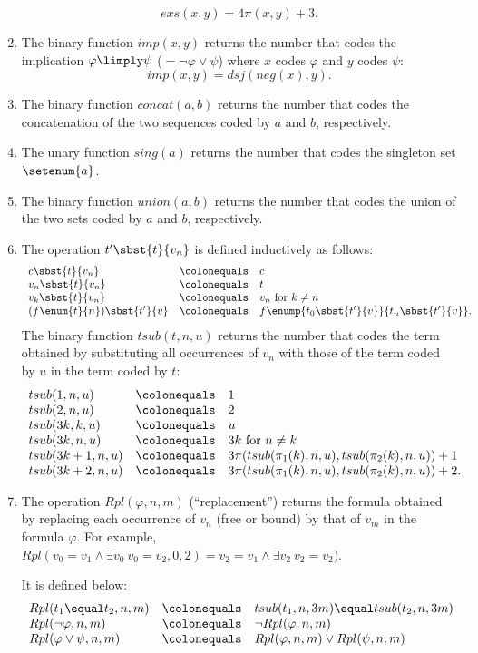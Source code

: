 \begin{enumerate}[1.]
\[
exs(x, y) = 4\pi(x, y) + 3.
\]
%
\item The binary function $imp(x, y)$ returns the number that codes the implication $\varphi \limply \psi$ ($= \neg\varphi \lor \psi$) where $x$ codes $\varphi$ and $y$ codes $\psi$:
\[
imp(x, y) = dsj(neg(x), y).
\]
%
\item The binary function $concat(a, b)$ returns the number that codes the concatenation of the two sequences coded by $a$ and $b$, respectively.
%
\item The unary function $sing(a)$ returns the number that codes the singleton set $\setenum{a}$.
%
\item The binary function $union(a, b)$ returns the number that codes the union of the two sets coded by $a$ and $b$, respectively.
%
\item The operation $t'\sbst{t}{v_n}$ is defined inductively as follows:
\[
\begin{array}{lll}
c\sbst{t}{v_n} & \colonequals & c \cr
v_n\sbst{t}{v_n} & \colonequals & t \cr
v_k\sbst{t}{v_n} & \colonequals & v_n \ \mbox{for \(k \neq n\)} \cr
(f\enum{t}{n})\sbst{t'}{v} & \colonequals & f\enump{t_0\sbst{t'}{v}}{t_n\sbst{t'}{v}}.
\end{array}
\]
The binary function $tsub(t, n, u)$ returns the number that codes the term obtained by substituting all occurrences of $v_n$ with those of the term coded by $u$ in the term coded by $t$:
\[
\begin{array}{lll}
tsub(1, n, u) & \colonequals & 1 \cr
tsub(2, n, u) & \colonequals & 2 \cr
tsub(3k, k, u) & \colonequals & u \cr
tsub(3k, n, u) & \colonequals & 3k \ \mbox{for \(n \neq k\)} \cr
tsub(3k + 1, n, u) & \colonequals & 3\pi(tsub(\pi_1(k), n, u), tsub(\pi_2(k), n, u)) + 1 \cr
tsub(3k + 2, n, u) & \colonequals & 3\pi(tsub(\pi_1(k), n, u), tsub(\pi_2(k), n, u)) + 2.
\end{array}
\]
%
\item The operation $Rpl(\varphi, n, m)$ (``replacement'') returns the formula obtained by replacing each occurrence of $v_n$ (free or bound) by that of $v_m$ in the formula $\varphi$. For example, $Rpl(v_0 \equal v_1 \land \exists v_0 \ v_0 \equal v_2, 0, 2) = v_2 \equal v_1 \land \exists v_2 \ v_2 \equal v_2)$.
\par It is defined below:
\[
\begin{array}{lll}
Rpl(t_1 \equal t_2, n, m) & \colonequals & tsub(t_1, n, 3m) \equal tsub(t_2, n, 3m) \cr
Rpl(\neg\varphi, n, m) & \colonequals & \neg Rpl(\varphi, n, m) \cr
Rpl(\varphi \lor \psi, n, m) & \colonequals & Rpl(\varphi, n, m) \lor Rpl(\psi, n, m) \cr

\end{array}\]
\end{enumerate}
